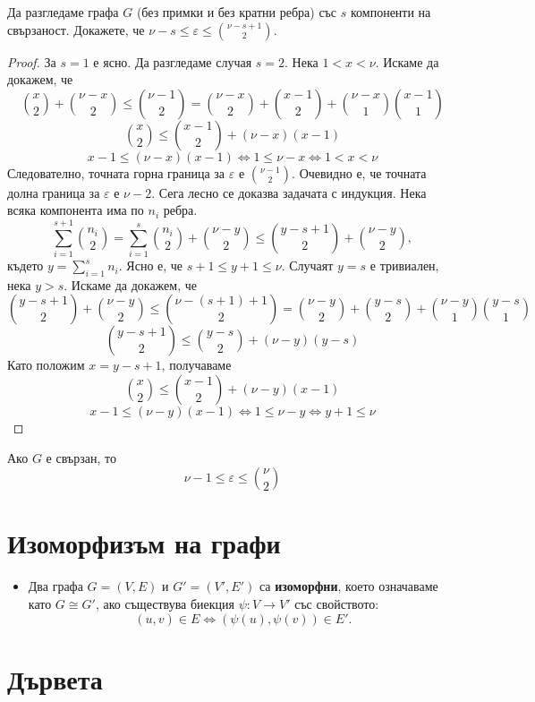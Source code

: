 \begin{problem} %
  Да разгледаме графа $G$ (без примки и без кратни ребра) със $s$ компоненти на свързаност.
  Докажете, че $\nu - s \leq \varepsilon \leq \binom{\nu-s+1}{2}$.
\end{problem}
\begin{proof}
  За $s = 1$ е ясно.
  Да разгледаме случая $s = 2$.
  Нека $1 < x <\nu$. Искаме да докажем, че 
  \[\binom{x}{2} + \binom{\nu-x}{2} \leq \binom{\nu-1}{2} = \binom{\nu-x}{2} + \binom{x-1}{2} + \binom{\nu-x}{1}\binom{x-1}{1}\]
  \[\binom{x}{2} \leq \binom{x-1}{2} + (\nu-x)(x-1)\]
  \[x-1 \leq (\nu-x)(x-1) \iff 1 \leq \nu - x \iff 1 < x < \nu\]
  Следователно, точната горна граница за $\varepsilon$ е $\binom{\nu - 1}{2}$. 
  Очевидно е, че точната долна граница за $\varepsilon$ е $\nu - 2$.
  Сега лесно се доказва задачата с индукция.
  Нека всяка компонента има по $n_i$ ребра. 
  \[\sum^{s+1}_{i=1}\binom{n_i}{2} = \sum^{s}_{i=1}\binom{n_i}{2} + \binom{\nu - y}{2} \leq \binom{y-s+1}{2} + \binom{\nu - y}{2},\]
  където $y = \sum^s_{i=1}n_i$. Ясно е, че $s+1\leq y + 1\leq\nu$.
  Случаят $y = s$ е тривиален, нека $y > s$.
  Искаме да докажем, че 
  \[\binom{y-s+1}{2} + \binom{\nu - y}{2} \leq \binom{\nu - (s+1) + 1}{2} = \binom{\nu-y}{2} + \binom{y-s}{2} + \binom{\nu-y}{1}\binom{y-s}{1} \]
  \[\binom{y-s+1}{2} \leq  \binom{y-s}{2} + (\nu-y)(y-s) \]
  Като положим $x = y-s+1$, получаваме
  \[\binom{x}{2} \leq  \binom{x-1}{2} + (\nu-y)(x-1) \]
  \[x-1 \leq (\nu-y)(x-1) \iff 1 \leq \nu - y \iff y+1 \leq \nu\]
\end{proof}

\begin{remark}
  Ако $G$ е свързан, то \[\nu-1\leq\varepsilon\leq\binom{\nu}{2}\]
\end{remark}


\section{Изоморфизъм на графи}

\begin{itemize}
\item
  Два графа $G = (V,E)$ и $G' = (V',E')$ са {\bf изоморфни},
  което означаваме като $G \cong G'$, ако съществува биекция $\psi:V\to V'$ със свойството:
  \[(u,v) \in E \iff (\psi(u),\psi(v)) \in E'.\]
\end{itemize}

\section{Дървета}

